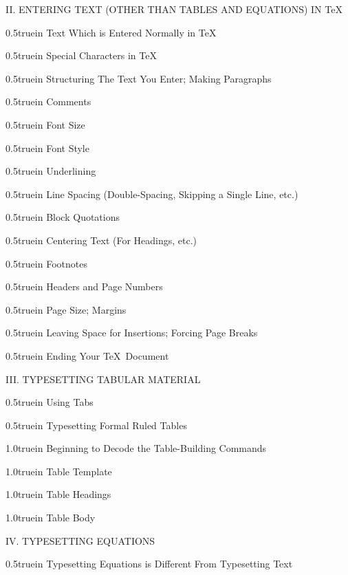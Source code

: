 II. ENTERING TEXT (OTHER THAN TABLES AND EQUATIONS) IN \TeX
\medskip\par\hglue 0.5truein
Text Which is Entered Normally in \TeX\ \leaderfill{}
\par\hglue 0.5truein
Special Characters in \TeX\ \leaderfill{}
\par\hglue 0.5truein
Structuring The Text You Enter; Making Paragraphs \leaderfill{}
\par\hglue 0.5truein
Comments \leaderfill{}
\par\hglue 0.5truein
Font Size \leaderfill{}
\par\hglue 0.5truein
Font Style \leaderfill{}
\par\hglue 0.5truein
Underlining \leaderfill{}
\par\hglue 0.5truein
Line Spacing (Double-Spacing, Skipping a Single Line, etc.) \leaderfill{}
\par\hglue 0.5truein
Block Quotations \leaderfill{}
\par\hglue 0.5truein
Centering Text (For Headings, etc.) \leaderfill{}
\par\hglue 0.5truein
Footnotes \leaderfill{}
\par\hglue 0.5truein
Headers and Page Numbers \leaderfill{}
\par\hglue 0.5truein
Page Size; Margins \leaderfill{}
\par\hglue 0.5truein
Leaving Space for Insertions; Forcing Page Breaks \leaderfill{}
\par\hglue 0.5truein
Ending Your \TeX\ Document \leaderfill{}
\bigskip\par\noindent
III. TYPESETTING TABULAR MATERIAL
\medskip\par\hglue 0.5truein
Using Tabs \leaderfill{}
\par\hglue 0.5truein
Typesetting Formal Ruled Tables \leaderfill{}
\par\hglue 1.0truein
Beginning to Decode the Table-Building Commands \leaderfill{}
\par\hglue 1.0truein
Table Template \leaderfill{}
\par\hglue 1.0truein
Table Headings \leaderfill{}
\par\hglue 1.0truein
Table Body \leaderfill{}
\bigskip\par\noindent
IV. TYPESETTING EQUATIONS
\medskip\par\hglue 0.5truein
Typesetting Equations is Different From Typesetting Text \leaderfill{}
